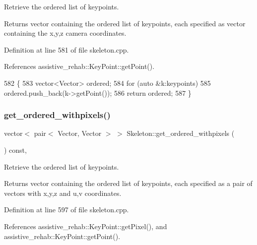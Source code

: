 Retrieve the ordered list of keypoints. 

\begin{DoxyReturn}{Returns}
vector containing the ordered list of keypoints, each specified as vector containing the x,y,z camera coordinates. 
\end{DoxyReturn}


Definition at line 581 of file skeleton.\+cpp.



References assistive\+\_\+rehab\+::\+Key\+Point\+::get\+Point().


\begin{DoxyCode}
582 \{
583     vector<Vector> ordered;
584     \textcolor{keywordflow}{for} (\textcolor{keyword}{auto} &k:keypoints)
585         ordered.push\_back(k->getPoint());
586     \textcolor{keywordflow}{return} ordered;
587 \}
\end{DoxyCode}
\mbox{\label{classassistive__rehab_1_1Skeleton_a270506cde494cb4261c7892edb46ce53}} 
\subsubsection{\texorpdfstring{get\+\_\+ordered\+\_\+withpixels()}{get\_ordered\_withpixels()}}
{\footnotesize\ttfamily vector$<$ pair$<$ Vector, Vector $>$ $>$ Skeleton\+::get\+\_\+ordered\+\_\+withpixels (\begin{DoxyParamCaption}{ }\end{DoxyParamCaption}) const\hspace{0.3cm}{\ttfamily [virtual]}, {\ttfamily [inherited]}}



Retrieve the ordered list of keypoints. 

\begin{DoxyReturn}{Returns}
vector containing the ordered list of keypoints, each specified as a pair of vectors with x,y,z and u,v coordinates. 
\end{DoxyReturn}


Definition at line 597 of file skeleton.\+cpp.



References assistive\+\_\+rehab\+::\+Key\+Point\+::get\+Pixel(), and assistive\+\_\+rehab\+::\+Key\+Point\+::get\+Point().


